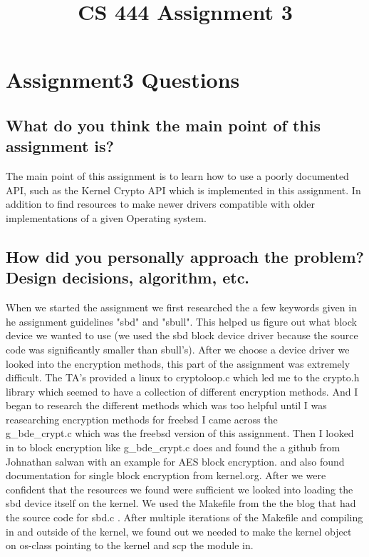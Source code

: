 \documentclass[letterpaper,10pt,titlepage]{IEEEtran}
\author{\name}
\title{CS 444 Assignment 3}
\begin{document}
\maketitle
\hrulefill

\section{Assignment3 Questions}
\subsection{What do you think the main point of this assignment is?}
The main point of this assignment is to learn how to use a poorly documented API, such as the Kernel Crypto API which is implemented in this assignment. In addition to find resources to make newer drivers compatible with older implementations of a given Operating system.\\
\subsection{How did you personally approach the problem? Design decisions, algorithm, etc.} When we started the assignment we first researched the a few keywords given in he assignment guidelines "sbd" and "sbull". This helped us figure out what block device we wanted to use (we used the sbd block device driver because the source code was significantly smaller than sbull's). After we choose a device driver we looked into the encryption methods, this part of the assignment was extremely difficult. The TA's provided a linux to cryptoloop.c which led me to the crypto.h library which seemed to have a collection of different encryption methods. And I began to research the different methods which was too helpful until I was reasearching encryption methods for freebsd I came across the\\ g\_bde\_crypt.c\cite{FreeBSDk57:online} which was the freebsd version of this assignment. Then I looked in to block encryption like g\_bde\_crypt.c does and found the a github from Johnathan salwan with an example for AES block encryption\cite{stuffzcr53:online}. and also found documentation for single block encryption from kernel.org\cite{BlockCip50:online}. After we were confident that the resources we found were sufficient we looked into loading the sbd device itself on the kernel. We used the Makefile from the the blog that had the source code for sbd.c \cite{ASimpleB97:online}. After multiple iterations of the Makefile and compiling in and outside of the kernel, we found out we needed to make the kernel object on os-class pointing to the kernel and scp the module in.\\
\end{document}
